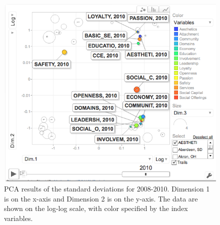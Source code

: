 \documentclass[11pt]{asaproc}
\begin{document}
\begin{figure}[H]
\begin{framed}
\hspace{0.5cm}
\begin{minipage}[b]{0.45\linewidth}
\centering
\includegraphics[width=\textwidth]{pcasd10.png}
\end{minipage}
\hspace{0.5cm}
\begin{minipage}[b]{0.45\linewidth}
\centering
\caption{PCA results of the standard deviations for 2008-2010. Dimension 1 is on the
x-axis and Dimension 2 is on the y-axis. The data are shown on the
log-log scale, with color specified by the index variables.}
\label{fig:pcaMCsd}
\end{minipage}
\end{framed}
\end{figure}
\end{document}
